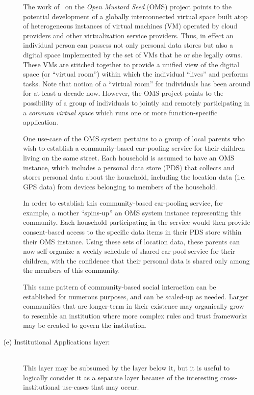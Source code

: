\begin{description}
The work of~\cite{HardjonoDeegan2014} 
on the {\em Open Mustard Seed} (OMS) project points to the potential
development of a globally interconnected virtual space
built atop of heterogeneous instances of virtual machines (VM)
operated by cloud providers and other virtualization service providers.
Thus, in effect an individual person can possess 
not only personal data stores
but also a digital space implemented by the set of VMs that he
or she legally owns.  These VMs are stitched together
to provide a unified view of the digital space
(or ``virtual room'') within which the individual
``lives'' and performs tasks.
Note that notion of a ``virtual room'' for individuals 
has been around for at least a decade now.
However, the OMS project
points to the possibility of a group of individuals
to jointly and remotely participating in a {\em common virtual space}
which runs one or more function-specific application.

One use-case of the OMS system pertains
to a group of local parents
who wish to establish a community-based car-pooling service
for their children living on the same street.
Each household is assumed to have an OMS instance,
which includes a personal data store (PDS)
that collects and stores personal data about the household,
including the location data (i.e. GPS data) from devices
belonging to members of the household.

In order to establish this community-based car-pooling service,
for example, a mother ``spins-up'' an OMS system instance
representing this community.
Each household participating in the service would then provide
consent-based access to the specific data items in their PDS store
within their OMS instance.
Using these sets of location data, these parents can now self-organize
a weekly schedule of shared car-pool service for their children,
with the confidence that their personal data is
shared only among the members of this community.

This same pattern of community-based social interaction
can be established for numerous purposes, and can be scaled-up
as needed.
Larger communities that are longer-term in their existence
may organically grow to resemble an institution 
where more complex rules and trust frameworks 
may be created to govern the institution.



\item[(e) Institutional Applications layer:]~\\
This layer may be subsumed by the layer below it,
but it is useful to logically consider it as a separate layer
because of the interesting cross-institutional use-cases
that may occur.


\end{description}
